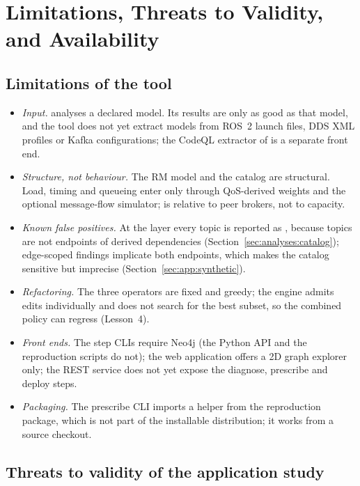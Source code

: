 \section{Limitations, Threats to Validity, and Availability}
\label{sec:limitations}

\subsection{Limitations of the tool}
\label{sec:lim:tool}

\begin{itemize}\tightlist
  \item \emph{Input.} \sag{} analyses a declared model. Its results are only as good as that model, and the tool does not yet extract models from ROS~2 launch files, DDS XML profiles or Kafka configurations; the CodeQL extractor of \citet{caliskan2026uyms} is a separate front end.
  \item \emph{Structure, not behaviour.} The RM model and the catalog are structural. Load, timing and queueing enter only through QoS-derived weights and the optional message-flow simulator;  is relative to peer brokers, not to capacity.
  \item \emph{Known false positives.} At the  layer every topic is reported as , because topics are not endpoints of derived dependencies (Section~\ref{sec:analyses:catalog}); edge-scoped findings implicate both endpoints, which makes the catalog sensitive but imprecise (Section~\ref{sec:app:synthetic}).
  \item \emph{Refactoring.} The three operators are fixed and greedy; the engine admits edits individually and does not search for the best subset, so the combined policy can regress (Lesson~4).
  \item \emph{Front ends.} The step CLIs require Neo4j (the Python API and the reproduction scripts do not); the web application offers a 2D graph explorer only; the REST service does not yet expose the diagnose, prescribe and deploy steps.
  \item \emph{Packaging.} The prescribe CLI imports a helper from the reproduction package, which is not part of the installable distribution; it works from a source checkout.
\end{itemize}

\subsection{Threats to validity of the application study}
\label{sec:lim:threats}

